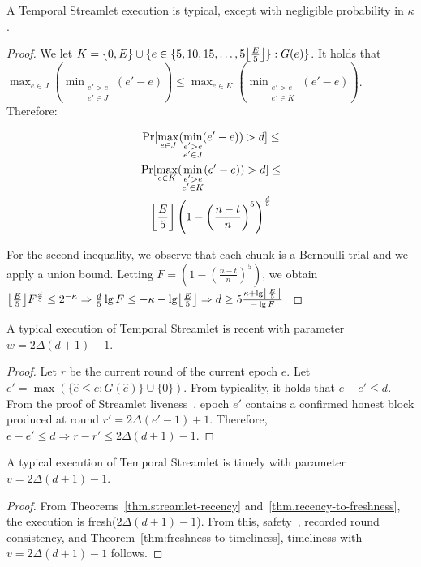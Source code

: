 \begin{lemma} \label{lem:honest-quintuple}
  A Temporal Streamlet execution is typical, except with negligible probability in $\kappa$.
\end{lemma}
\begin{proof}
  We let $K = \{0, E\} \cup \{e \in \{5, 10, 15, \ldots, 5\floor*{\frac{E}{5}}\}: G(e)\}$.
  It holds that
  $\max_{e \in J}(\min_{\substack{e' > e \\ e' \in J}}(e' - e)) \leq \max_{e \in K}(\min_{\substack{e' > e \\ e' \in K}}(e' - e))$.
  Therefore:

  \begin{gather*}
      \Pr [\max_{e \in J}(\min_{\substack{e' > e \\ e' \in J}}(e' - e)) > d] \leq \\
      \Pr [\max_{e \in K}(\min_{\substack{e' > e \\ e' \in K}}(e' - e)) > d] \leq \\
      \floor*{\frac{E}{5}} \left(1 - \left(\frac{n - t}{n}\right)^5\right)^{\frac{d}{5}}
  \end{gather*}

  For the second inequality, we observe that each chunk is a Bernoulli trial and we
  apply a union bound.
  Letting $F = \left(1 - \left(\frac{n - t}{n}\right)^5\right)$, we obtain
  $\floor*{\frac{E}{5}} F^{\frac{d}{5}} \leq 2^{-\kappa} \Rightarrow
   \frac{d}{5} \lg F \leq -\kappa - \lg \floor*{\frac{E}{5}} \Rightarrow
   d \geq 5\frac{\kappa + \lg \floor*{\frac{E}{5}}}{- \lg F}
  $.
  \Qed
\end{proof}

\begin{theorem} \label{thm.streamlet-recency}
  A typical execution of Temporal Streamlet is recent with parameter $w = 2\Delta (d + 1) - 1$.
\end{theorem}
\begin{proof}
  Let $r$ be the current round of the current epoch $e$.
  Let $e' = \max(\{\hat e \leq e: G(\hat e)\} \cup \{0\})$.
  From typicality, it holds that $e - e' \leq d$.
  From the proof of Streamlet liveness~\cite[Theorem 6]{streamlet}, epoch $e'$ contains
  a confirmed honest block produced at round $r' = 2\Delta (e' - 1) + 1$.
  Therefore, $e - e' \leq d
  \Rightarrow r - r' \leq 2\Delta (d + 1) - 1$.
  \Qed
\end{proof}

\begin{corollary}
  A typical execution of Temporal Streamlet is timely with parameter $v = 2\Delta (d + 1) - 1$.
\end{corollary}
\begin{proof}
  From Theorems~\ref{thm.streamlet-recency} and~\ref{thm.recency-to-freshness},
  the execution is fresh($2\Delta (d + 1) - 1$).
  From this, safety~\cite[Theorem 3]{streamlet},
  recorded round consistency, and Theorem~\ref{thm:freshness-to-timeliness},
  timeliness with $v = 2\Delta (d + 1) - 1$ follows.
  \Qed
\end{proof}